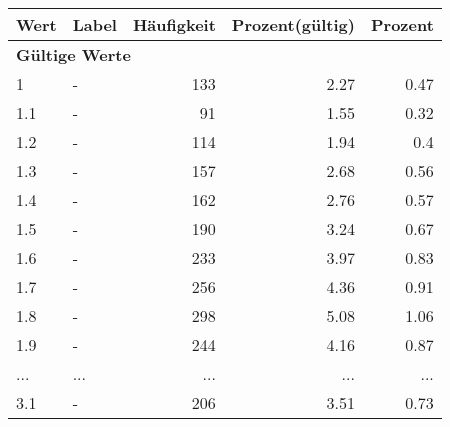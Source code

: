      \begin{longtable}{lXrrr}
     \toprule
     \textbf{Wert} & \textbf{Label} & \textbf{Häufigkeit} & \textbf{Prozent(gültig)} & \textbf{Prozent} \\
     \endhead
     \midrule
     \multicolumn{5}{l}{\textbf{Gültige Werte}}\\
        1 & \multicolumn{1}{X}{-} & %
          \num{133} &
          \num[round-mode=places,round-precision=2]{2.27} &
          \num[round-mode=places,round-precision=2]{0.47} \\
        1.1 & \multicolumn{1}{X}{-} & %
          \num{91} &
          \num[round-mode=places,round-precision=2]{1.55} &
          \num[round-mode=places,round-precision=2]{0.32} \\
        1.2 & \multicolumn{1}{X}{-} & %
          \num{114} &
          \num[round-mode=places,round-precision=2]{1.94} &
          \num[round-mode=places,round-precision=2]{0.4} \\
        1.3 & \multicolumn{1}{X}{-} & %
          \num{157} &
          \num[round-mode=places,round-precision=2]{2.68} &
          \num[round-mode=places,round-precision=2]{0.56} \\
        1.4 & \multicolumn{1}{X}{-} & %
          \num{162} &
          \num[round-mode=places,round-precision=2]{2.76} &
          \num[round-mode=places,round-precision=2]{0.57} \\
        1.5 & \multicolumn{1}{X}{-} & %
          \num{190} &
          \num[round-mode=places,round-precision=2]{3.24} &
          \num[round-mode=places,round-precision=2]{0.67} \\
        1.6 & \multicolumn{1}{X}{-} & %
          \num{233} &
          \num[round-mode=places,round-precision=2]{3.97} &
          \num[round-mode=places,round-precision=2]{0.83} \\
        1.7 & \multicolumn{1}{X}{-} & %
          \num{256} &
          \num[round-mode=places,round-precision=2]{4.36} &
          \num[round-mode=places,round-precision=2]{0.91} \\
        1.8 & \multicolumn{1}{X}{-} & %
          \num{298} &
          \num[round-mode=places,round-precision=2]{5.08} &
          \num[round-mode=places,round-precision=2]{1.06} \\
        1.9 & \multicolumn{1}{X}{-} & %
          \num{244} &
          \num[round-mode=places,round-precision=2]{4.16} &
          \num[round-mode=places,round-precision=2]{0.87} \\
       ... & ... & ... & ... & ... \\
        3.1 & \multicolumn{1}{X}{-} & %
          \num{206} &
          \num[round-mode=places,round-precision=2]{3.51} &
          \num[round-mode=places,round-precision=2]{0.73} \\


\end{longtable}
